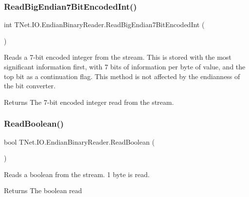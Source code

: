 \subsubsection{\texorpdfstring{Read\+Big\+Endian7\+Bit\+Encoded\+Int()}{ReadBigEndian7BitEncodedInt()}}
{\footnotesize\ttfamily int T\+Net.\+I\+O.\+Endian\+Binary\+Reader.\+Read\+Big\+Endian7\+Bit\+Encoded\+Int (\begin{DoxyParamCaption}{ }\end{DoxyParamCaption})}



Reads a 7-\/bit encoded integer from the stream. This is stored with the most significant information first, with 7 bits of information per byte of value, and the top bit as a continuation flag. This method is not affected by the endianness of the bit converter. 

\begin{DoxyReturn}{Returns}
The 7-\/bit encoded integer read from the stream.
\end{DoxyReturn}
\mbox{\label{class_t_net_1_1_i_o_1_1_endian_binary_reader_a23eba8362b660682eb20797b04e3bf3f}} 
\subsubsection{\texorpdfstring{Read\+Boolean()}{ReadBoolean()}}
{\footnotesize\ttfamily bool T\+Net.\+I\+O.\+Endian\+Binary\+Reader.\+Read\+Boolean (\begin{DoxyParamCaption}{ }\end{DoxyParamCaption})}



Reads a boolean from the stream. 1 byte is read. 

\begin{DoxyReturn}{Returns}
The boolean read
\end{DoxyReturn}
\mbox{\label{class_t_net_1_1_i_o_1_1_endian_binary_reader_ac68abe7686ebf47317658260a7e46c05}} 
